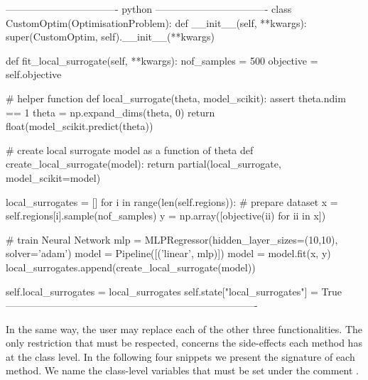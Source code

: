 \begin{Code}
---------------------------------- python ----------------------------------
class CustomOptim(OptimisationProblem):
    def __init__(self, **kwargs):
        super(CustomOptim, self).__init__(**kwargs)

    def fit_local_surrogate(self, **kwargs):
        nof_samples = 500
        objective = self.objective

        # helper function
        def local_surrogate(theta, model_scikit):
            assert theta.ndim == 1
            theta = np.expand_dims(theta, 0)
            return float(model_scikit.predict(theta))

        # create local surrogate model as a function of theta
        def create_local_surrogate(model):
            return partial(local_surrogate, model_scikit=model)

        local_surrogates = []
        for i in range(len(self.regions)):
            # prepare dataset
            x = self.regions[i].sample(nof_samples)
            y = np.array([objective(ii) for ii in x])

            # train Neural Network
            mlp = MLPRegressor(hidden_layer_sizes=(10,10), solver='adam')
            model = Pipeline([('linear', mlp)])
            model = model.fit(x, y)
            local_surrogates.append(create_local_surrogate(model))

        self.local_surrogates = local_surrogates
        self.state["local_surrogates"] = True
----------------------------------------------------------------------------
\end{Code}

In the same way, the user may replace each of the other three
functionalities. The only restriction that must be respected, concerns
the side-effects each method has at the 
class level. In the following four snippets we present the signature
of each method. We name the class-level variables that must be set
under the comment .


